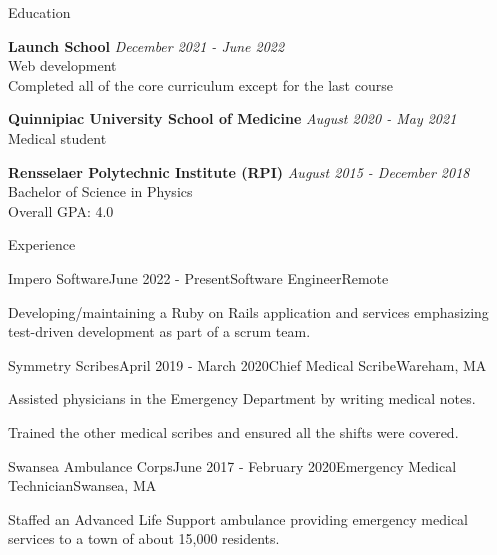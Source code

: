 \documentclass{resume}
\begin{document}
  \begin{rSection}{Education}

    {\bf Launch School} \hfill {\em December 2021 - \em June 2022} \\
    Web development \\
    Completed all of the core curriculum except for the last course

    {\bf Quinnipiac University School of Medicine} \hfill {\em August 2020 - \em May 2021} \\
    Medical student

    {\bf Rensselaer Polytechnic Institute (RPI)} \hfill {\em August 2015 - December 2018} \\ 
    Bachelor of Science in Physics  \\
    Overall GPA: 4.0
  \end{rSection}
  
  \begin{rSection}{Experience}

  \begin{rSubsection}{Impero Software}{June 2022 - Present}{Software Engineer}{Remote}
      \item Developing/maintaining a Ruby on Rails application and services emphasizing test-driven development as part of a scrum team.
  \end{rSubsection}

    \begin{rSubsection}{Symmetry Scribes}{April 2019 - March 2020}{Chief Medical Scribe}{Wareham, MA}
    \item Assisted physicians in the Emergency Department by writing medical notes.
    \item Trained the other medical scribes and ensured all the shifts were covered.
    \end{rSubsection}

    \begin{rSubsection}{Swansea Ambulance Corps}{June 2017 - February 2020}{Emergency Medical Technician}{Swansea, MA}
    \item Staffed an Advanced Life Support ambulance providing emergency medical services to a town of about 15,000 residents.
    \end{rSubsection}
  
  \end{rSection}
  
\end{document}
